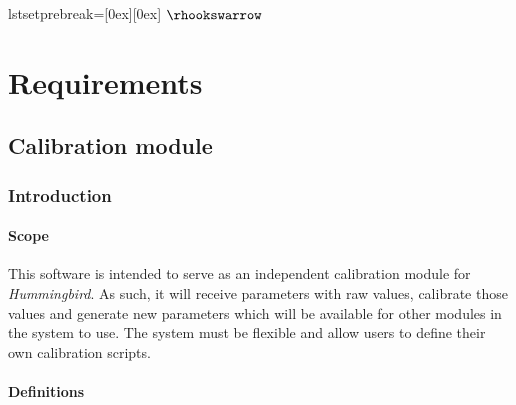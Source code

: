 
lstset{prebreak=\raisebox{0ex}[0ex][0ex]
        {\ensuremath{\rhookswarrow}}}
\lstset{breaklines=true, breakatwhitespace=true}
\lstset{numbers=left, numberstyle=\scriptsize}
 


\chapter{Requirements}


\section{Calibration module}

\subsection{Introduction}

\subsubsection{Scope}

This software is intended to serve as an independent calibration module for \emph{Hummingbird}. As such, it will receive parameters with raw values, calibrate those values and generate new parameters which will be available for other modules in the system to use. The system must be flexible and allow users to define their own calibration scripts.

\subsubsection{Definitions}

